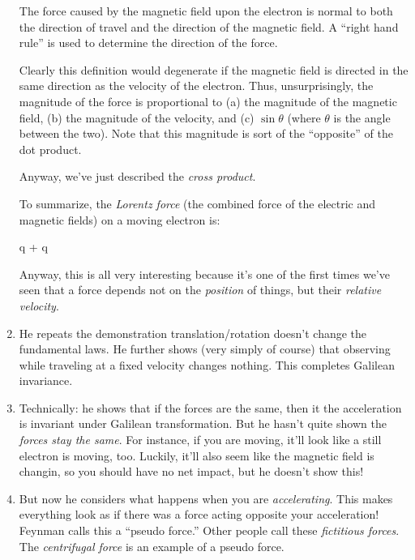 \begin{enumerate}
  The force caused by the magnetic field upon the electron is normal to
  both the direction of travel and the direction of the magnetic field.
  A ``right hand rule'' is used to determine the direction of the force.

  Clearly this definition would degenerate if the magnetic field is
  directed in the same direction as the velocity of the electron. Thus,
  unsurprisingly, the magnitude of the force is proportional to (a) the
  magnitude of the magnetic field, (b) the magnitude of the velocity,
  and (c) $\sin \theta$ (where $\theta$ is the angle between the two).
  Note that this magnitude is sort of the ``opposite'' of the dot
  product.

  Anyway, we've just described the \emph{cross product}.

  To summarize, the \emph{Lorentz force} (the combined force of
  the electric and magnetic fields) on a moving electron is:

  \begin{nedqn}
    \vF
  \eqcol
    q \vE
    +
    q \vv \times \vB
  \end{nedqn}

  Anyway, this is all very interesting because it's one of the first
  times we've seen that a force depends not on the \emph{position} of
  things, but their \emph{relative velocity}.

  \item He repeats the demonstration translation/rotation doesn't change
  the fundamental laws. He further shows (very simply of course) that
  observing while traveling at a fixed velocity changes nothing. This
  completes Galilean invariance.

  \item Technically: he shows that if the forces are the same, then it
  the acceleration is invariant under Galilean transformation. But he
  hasn't quite shown the \emph{forces stay the same}. For instance, if
  you are moving, it'll look like a still electron is moving, too.
  Luckily, it'll also seem like the magnetic field is changin, so you
  should have no net impact, but he doesn't show this!

  \item But now he considers what happens when you are
  \emph{accelerating}. This makes everything look as if there was a
  force acting opposite your acceleration! Feynman calls this a ``pseudo
  force.'' Other people call these \emph{fictitious forces}. The
  \emph{centrifugal force} is an example of a pseudo force.


\end{enumerate}
